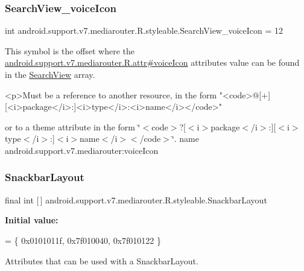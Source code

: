 \subsubsection{\texorpdfstring{Search\+View\+\_\+voice\+Icon}{SearchView\_voiceIcon}}
{\footnotesize\ttfamily int android.\+support.\+v7.\+mediarouter.\+R.\+styleable.\+Search\+View\+\_\+voice\+Icon = 12\hspace{0.3cm}{\ttfamily [static]}}

This symbol is the offset where the \hyperlink{classandroid_1_1support_1_1v7_1_1mediarouter_1_1R_1_1attr_a123ea20b20287eb9f23c52cb995886c4}{android.\+support.\+v7.\+mediarouter.\+R.\+attr\#voice\+Icon} attribute\textquotesingle{}s value can be found in the \hyperlink{classandroid_1_1support_1_1v7_1_1mediarouter_1_1R_1_1styleable_a5573e3195bf93122a37c69394418c7d7}{Search\+View} array.

\begin{DoxyVerb}      <p>Must be a reference to another resource, in the form "<code>@[+][<i>package</i>:]<i>type</i>:<i>name</i></code>"
\end{DoxyVerb}
 or to a theme attribute in the form \char`\"{}$<$code$>$?\mbox{[}$<$i$>$package$<$/i$>$\+:\mbox{]}\mbox{[}$<$i$>$type$<$/i$>$\+:\mbox{]}$<$i$>$name$<$/i$>$$<$/code$>$\char`\"{}.  name android.\+support.\+v7.\+mediarouter\+:voice\+Icon \mbox{\label{classandroid_1_1support_1_1v7_1_1mediarouter_1_1R_1_1styleable_a1653efd198ae58b5c9d976b12d23f9a7}} 
\subsubsection{\texorpdfstring{Snackbar\+Layout}{SnackbarLayout}}
{\footnotesize\ttfamily final int \mbox{[}$\,$\mbox{]} android.\+support.\+v7.\+mediarouter.\+R.\+styleable.\+Snackbar\+Layout\hspace{0.3cm}{\ttfamily [static]}}

{\bfseries Initial value\+:}
\begin{DoxyCode}
= \{
            0x0101011f, 0x7f010040, 0x7f010122
        \}
\end{DoxyCode}
Attributes that can be used with a Snackbar\+Layout. 

